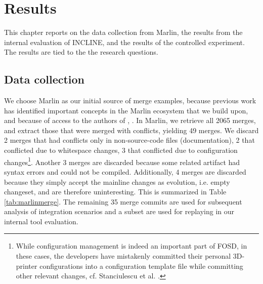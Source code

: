 \chapter{Results}
This chapter reports on the data collection from Marlin, the results from the internal evaluation of INCLINE, and the results of the controlled experiment. The results are tied to the the research questions.

\section{Data collection}\label{data-coll-res}
We choose Marlin as our initial source of merge examples, because previous work has identified important concepts in the Marlin ecosystem that we build upon, and because of access to the authors of \cite{stanciulescu2015}, \cite{stanciulescu2016concepts}. In Marlin, we retrieve all 2065 merges, and extract those that were merged with conflicts, yielding 49 merges. We discard 2 merges that had conflicts only in non-source-code files (documentation), 2 that conflicted due to whitespace changes, 3 that conflicted due to configuration changes\footnote{While configuration management is indeed an important part of FOSD, in these cases, the developers have mistakenly committed their personal 3D-printer configurations into a configuration template file while committing other relevant changes, cf. Stanciulescu et al. \cite{stanciulescu2015}.}. Another 3 merges are discarded because some related artifact had syntax errors and could not be compiled. Additionally, 4 merges are discarded because they simply accept the mainline changes as evolution, i.e. empty changeset, and are therefore uninteresting. This is summarized in Table \ref{tab:marlinmerge}. The remaining 35 merge commits are used for subsequent analysis of integration scenarios and a subset are used for replaying in our internal tool evaluation.

